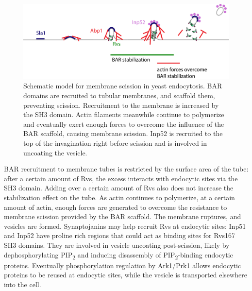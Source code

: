 \begin{figure}[H]
	\hspace*{-1cm}
	\includegraphics[scale=0.6]{figures/discussion/yeast_schematic_concl2}
	\caption [Model for membrane scission in yeast]
	{ Schematic model for membrane scission in yeast endocytosis. BAR domains are recruited to tubular membranes, and scaffold them, preventing scission. Recruitment to the membrane is increased by the SH3 domain. Actin filaments meanwhile continue to polymerize and eventually exert enough forces to overcome the influence of the BAR scaffold, causing membrane scission. Inp52 is recruited to the top of the invagination right before scission and is involved in uncoating the vesicle. 
		\label{fig_scaffold}}
\end{figure}

BAR recruitment to membrane tubes is restricted by the surface area of the tube: after a certain amount of Rvs, the excess interacts with endocytic sites via the SH3 domain. Adding over a certain amount of Rvs also does not increase the stabilization effect on the tube. As actin continues to polymerize, at a certain amount of actin, enough forces are generated to overcome the resistance to membrane scission provided by the BAR scaffold. The membrane ruptures, and vesicles are formed. Synaptojanins may help recruit Rvs at endocytic sites: Inp51 and Inp52 have proline rich regions that could act as binding sites for Rvs167 SH3 domains. They are involved in vesicle uncoating post-scission, likely by dephosphorylating PIP\textsubscript{2} and inducing disassembly of 	PIP\textsubscript{2}-binding endocytic proteins. Eventually phosphorylation regulation by Ark1/Prk1 allows endocytic proteins to be reused at endocytic sites, while the vesicle is transported elsewhere into the cell. 






